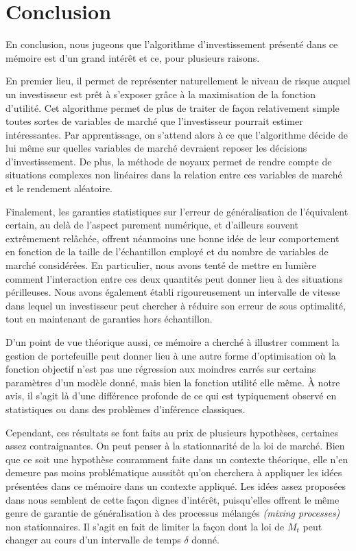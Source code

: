 \section{Conclusion}
\label{sec:conclusion}


En conclusion, nous jugeons que l'algorithme d'investissement présenté dans ce mémoire est
d'un grand intérêt et ce, pour plusieurs raisons.

En premier lieu, il permet de représenter naturellement le niveau de risque auquel un
investisseur est prêt à s'exposer grâce à la maximisation de la fonction d'utilité. Cet
algorithme permet de plus de traiter de façon relativement simple toutes sortes de
variables de marché que l'investisseur pourrait estimer intéressantes. Par apprentissage,
on s'attend alors à ce que l'algorithme décide de lui même sur quelles variables de marché
devraient reposer les décisions d'investissement. De plus, la méthode de noyaux permet de
rendre compte de situations complexes non linéaires dans la relation entre ces variables
de marché et le rendement aléatoire.

Finalement, les garanties statistiques sur l'erreur de généralisation de l'équivalent
certain, au delà de l'aspect purement numérique, et d'ailleurs souvent extrêmement
relâchée, offrent néanmoins une bonne idée de leur comportement en fonction de la taille
de l'échantillon employé et du nombre de variables de marché considérées. En particulier,
nous avons tenté de mettre en lumière comment l'interaction entre ces deux quantités peut
donner lieu à des situations périlleuses. Nous avons également établi rigoureusement un
intervalle de vitesse dans lequel un investisseur peut chercher à réduire son erreur de
sous optimalité, tout en maintenant de garanties hors échantillon.

D'un point de vue théorique aussi, ce mémoire a cherché à illustrer comment la gestion de
portefeuille peut donner lieu à une autre forme d'optimisation où la fonction objectif
n'est pas une régression aux moindres carrés sur certains paramètres d'un modèle donné,
mais bien la fonction utilité elle même. À notre avis, il s'agit là d'une différence
profonde de ce qui est typiquement observé en statistiques ou dans des problèmes
d'inférence classiques.

Cependant, ces résultats se font faits au prix de plusieurs hypothèses, certaines assez
contraignantes. On peut penser à la stationnarité de la loi de marché. Bien que ce soit une
hypothèse couramment faite dans un contexte théorique, elle n'en demeure pas moins
problématique aussitôt qu'on cherchera à appliquer les idées présentées dans ce mémoire
dans un contexte appliqué. Les idées assez proposées dans
\cite{kuznetsov2017generalization} nous semblent de cette façon dignes d'intérêt,
puisqu'elles offrent le même genre de garantie de généralisation à des processus mélangés
\textsl{(mixing processes)} non stationnaires. Il s'agit en fait de limiter la façon dont
la loi de $M_t$ peut changer au cours d'un intervalle de temps $\delta$ donné.


